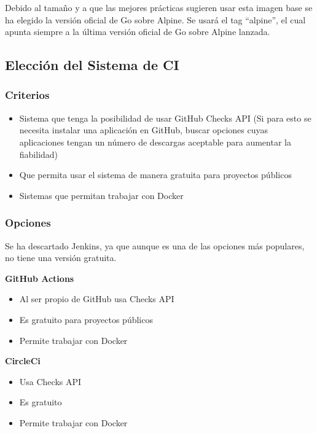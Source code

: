 Debido al tamaño y a que las mejores prácticas sugieren usar esta imagen
base se ha elegido la versión oficial de Go sobre Alpine. Se usará el
tag ``alpine'', el cual apunta siempre a la última versión oficial de Go
sobre Alpine lanzada.

\newpage
\subsection{Elección del Sistema de CI}

\subsubsection{Criterios}

\begin{itemize}
\item
  Sistema que tenga la posibilidad de usar GitHub Checks API (Si para
  esto se necesita instalar una aplicación en GitHub, buscar opciones
  cuyas aplicaciones tengan un número de descargas aceptable para
  aumentar la fiabilidad)
\item
  Que permita usar el sistema de manera gratuita para proyectos públicos
\item
  Sistemas que permitan trabajar con Docker
\end{itemize}

\subsubsection{Opciones}

Se ha descartado Jenkins, ya que aunque es una de las opciones más
populares, no tiene una versión gratuita.

\textbf{GitHub Actions}

\begin{itemize}
\item
  Al ser propio de GitHub usa Checks API
\item
  Es gratuito para proyectos públicos
\item
  Permite trabajar con Docker
\end{itemize}

\textbf{CircleCi}

\begin{itemize}
\item
  Usa Checks API
\item
  Es gratuito
\item
  Permite trabajar con Docker
\end{itemize}

